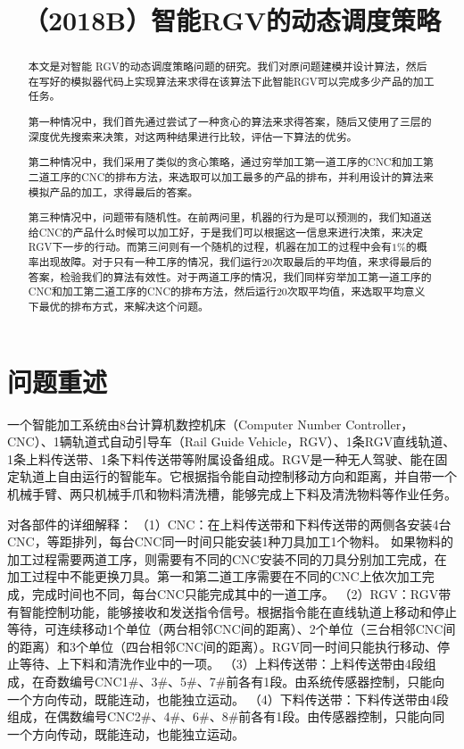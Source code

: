 \documentclass{cumcmthesis}
\title{（2018B）智能RGV的动态调度策略}
\begin{document}
\maketitle
\begin{abstract}

本文是对智能 RGV的动态调度策略问题的研究。我们对原问题建模并设计算法，然后在写好的模拟器代码上实现算法来求得在该算法下此智能RGV可以完成多少产品的加工任务。

第一种情况中，我们首先通过尝试了一种贪心的算法来求得答案，随后又使用了三层的深度优先搜索来决策，对这两种结果进行比较，评估一下算法的优劣。

第二种情况中，我们采用了类似的贪心策略，通过穷举加工第一道工序的CNC和加工第二道工序的CNC的排布方法，来选取可以加工最多的产品的排布，并利用设计的算法来模拟产品的加工，求得最后的答案。

第三种情况中，问题带有随机性。在前两问里，机器的行为是可以预测的，我们知道送给CNC的产品什么时候可以加工好，于是我们可以根据这一信息来进行决策，来决定RGV下一步的行动。而第三问则有一个随机的过程，机器在加工的过程中会有$1\%$的概率出现故障。对于只有一种工序的情况，我们运行20次取最后的平均值，来求得最后的答案，检验我们的算法有效性。对于两道工序的情况，我们同样穷举加工第一道工序的CNC和加工第二道工序的CNC的排布方法，然后运行20次取平均值，来选取平均意义下最优的排布方式，来解决这个问题。

\end{abstract}

\tableofcontents

\section{问题重述}

一个智能加工系统由8台计算机数控机床（Computer Number Controller，CNC）、1辆轨道式自动引导车（Rail Guide Vehicle，RGV）、1条RGV直线轨道、1条上料传送带、1条下料传送带等附属设备组成。RGV是一种无人驾驶、能在固定轨道上自由运行的智能车。它根据指令能自动控制移动方向和距离，并自带一个机械手臂、两只机械手爪和物料清洗槽，能够完成上下料及清洗物料等作业任务。

对各部件的详细解释：
（1）CNC：在上料传送带和下料传送带的两侧各安装4台CNC，等距排列，每台CNC同一时间只能安装1种刀具加工1个物料。
如果物料的加工过程需要两道工序，则需要有不同的CNC安装不同的刀具分别加工完成，在加工过程中不能更换刀具。第一和第二道工序需要在不同的CNC上依次加工完成，完成时间也不同，每台CNC只能完成其中的一道工序。
（2）RGV：RGV带有智能控制功能，能够接收和发送指令信号。根据指令能在直线轨道上移动和停止等待，可连续移动1个单位（两台相邻CNC间的距离）、2个单位（三台相邻CNC间的距离）和3个单位（四台相邻CNC间的距离）。RGV同一时间只能执行移动、停止等待、上下料和清洗作业中的一项。
（3）上料传送带：上料传送带由4段组成，在奇数编号CNC1\#、3\#、5\#、7\#前各有1段。由系统传感器控制，只能向一个方向传动，既能连动，也能独立运动。
（4）下料传送带：下料传送带由4段组成，在偶数编号CNC2\#、4\#、6\#、8\#前各有1段。由传感器控制，只能向同一个方向传动，既能连动，也能独立运动。
\end{document}
